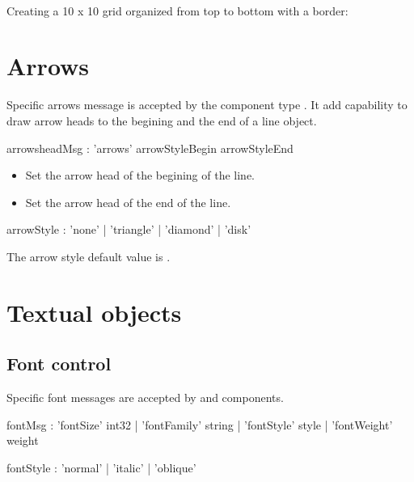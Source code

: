 \documentclass[a4paper,twoside]{report}
\newcommand{\sublevel}[1]	{\section{#1}}
\newcommand{\subsublevel}[1]	{\subsection{#1}}
\begin{document}
\example \\
Creating a 10 x 10 grid organized from top to bottom with a border:


\sublevel{Arrows}
\label{arrows}

Specific arrows message is accepted by the component type . It add capability to draw arrow heads to the begining and the end of a line object.


\begin{rail}
arrowsheadMsg : 'arrows' arrowStyleBegin arrowStyleEnd 
\end{rail}

\begin{itemize}
\item {} Set the arrow head of the begining of the line.
\item {} Set the arrow head of the end of the line.
\end{itemize}
\begin{rail}
arrowStyle : 'none' | 'triangle' | 'diamond' | 'disk'
\end{rail}
The arrow style default value is .

\sublevel{Textual objects}
\subsublevel{Font control}
\label{fontctrl}
Specific font messages are accepted by    and   components.


\begin{rail}
fontMsg : 	  'fontSize' int32 
			| 'fontFamily' string
			| 'fontStyle' style
			| 'fontWeight' weight
\end{rail}


\begin{rail}
	fontStyle : 'normal' | 'italic' | 'oblique'
\end{rail}
\end{document}

